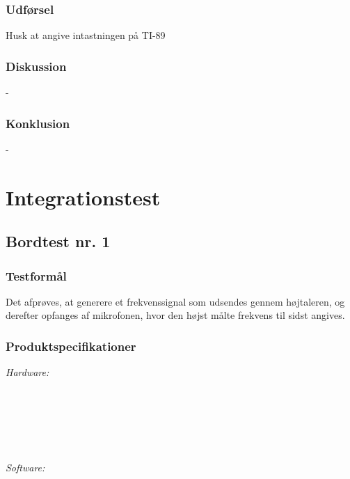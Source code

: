 {		\subsubsection{Udførsel}
			 
			 Husk at angive intastningen på TI-89

		\subsubsection{Diskussion} 
	-
	
	
		\subsubsection{Konklusion}
		 
	- 




\section{Integrationstest}

	\subsection{Bordtest nr. 1} %
	\label{bordtest1}
		\subsubsection{Testformål}
		Det afprøves, at generere et frekvenssignal som udsendes gennem højtaleren, og derefter opfanges af mikrofonen, hvor den højst målte frekvens til sidst angives.  
		\subsubsection{Produktspecifikationer}
		
		\textit{Hardware:}\\
		\\
		\\
		\pins\\
		\arduino\\
		\PC\\
		\usbkabel\\
	
		\textit{Software:}\\
		\labview\\
		\visa\\
		\vi\\
		\ardsw\
		
}
